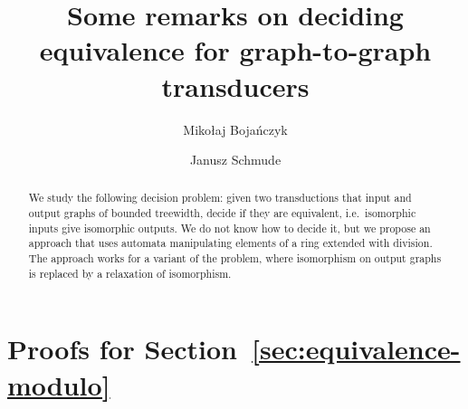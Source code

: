 \documentclass[a4paper,english]{lipics-v2019}
\title{Some remarks on deciding equivalence for graph-to-graph transducers}
\author{Miko\l aj Boja\' nczyk}{Institute of Informatics,\\ University of
Warsaw, Poland}{bojan@mimuw.edu.pl}{}{}
\author{Janusz Schmude}{Institute of Informatics,\\ University of
Warsaw, Poland}{jschmude@mimuw.edu.pl}{}{}
\begin{document}





\maketitle

\begin{abstract}
    We  study the following decision problem: given two \mso transductions that input and output graphs of bounded treewidth, decide if they are equivalent, i.e.~isomorphic inputs give isomorphic outputs. We do not know how to decide it, but  we  propose an approach that uses automata manipulating elements of a ring extended with division. The  approach works for  a variant of the problem, where  isomorphism on output graphs is replaced by a relaxation of isomorphism.
\end{abstract}


% 


% 

%



\appendix

\section{Proofs for Section~\ref{sec:equivalence-modulo}}


%
\end{document}
